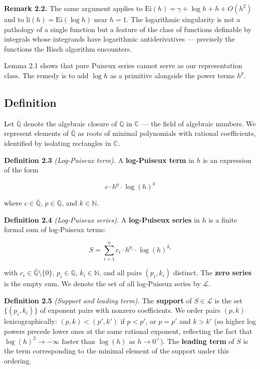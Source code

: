 \documentclass[12pt]{article}
\begin{document}
\textbf{Remark 2.2.} The same argument applies to
\(\mathrm{Ei}(h) = \gamma + \log h + h + O(h^2)\) and to
\(\mathrm{li}(h) = \mathrm{Ei}(\log h)\) near \(h = 1\). The logarithmic
singularity is not a pathology of a single function but a feature of the
class of functions definable by integrals whose integrands have
logarithmic antiderivatives --- precisely the functions the Risch
algorithm encounters.

Lemma 2.1 shows that pure Puiseux series cannot serve as our
representation class. The remedy is to add \(\log h\) as a primitive
alongside the power terms \(h^p\).


\subsection{Definition}\label{definition}

Let \(\bar{\mathbb{Q}}\) denote the algebraic closure of \(\mathbb{Q}\)
in \(\mathbb{C}\) --- the field of algebraic numbers. We represent
elements of \(\bar{\mathbb{Q}}\) as roots of minimal polynomials with
rational coefficients, identified by isolating rectangles in
\(\mathbb{C}\).

\textbf{Definition 2.3} \emph{(Log-Puiseux term).} A \textbf{log-Puiseux
term} in \(h\) is an expression of the form

\[c \cdot h^p \cdot \log(h)^k\]

where \(c \in \bar{\mathbb{Q}}\), \(p \in \mathbb{Q}\), and
\(k \in \mathbb{N}\).

\textbf{Definition 2.4} \emph{(Log-Puiseux series).} A
\textbf{log-Puiseux series} in \(h\) is a finite formal sum of
log-Puiseux terms:

\[S = \sum_{i=1}^{n} c_i \cdot h^{p_i} \cdot \log(h)^{k_i}\]

with \(c_i \in \bar{\mathbb{Q}} \setminus \{0\}\),
\(p_i \in \mathbb{Q}\), \(k_i \in \mathbb{N}\), and all pairs
\((p_i, k_i)\) distinct. The \textbf{zero series} is the empty sum. We
denote the set of all log-Puiseux series by \(\mathcal{L}\).

\textbf{Definition 2.5} \emph{(Support and leading term).} The
\textbf{support} of \(S \in \mathcal{L}\) is the set \(\{(p_i, k_i)\}\)
of exponent pairs with nonzero coefficients. We order pairs \((p, k)\)
lexicographically: \((p, k) < (p', k')\) if \(p < p'\), or \(p = p'\)
and \(k > k'\) (so higher log powers precede lower ones at the same
rational exponent, reflecting the fact that \(\log(h)^2 \to -\infty\)
faster than \(\log(h)\) as \(h \to 0^+\)). The \textbf{leading term} of
\(S\) is the term corresponding to the minimal element of the support
under this ordering.
\end{document}
